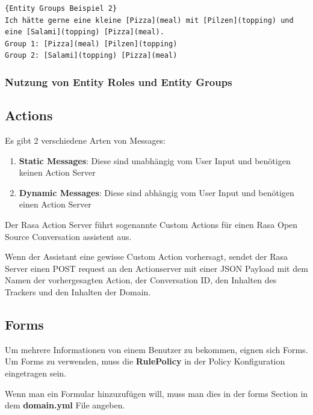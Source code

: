 \begin{lstlisting}[label={lst:entity-groups-example-2},caption={Entity Groups Beispiel 2}]{Entity Groups Beispiel 2}
Ich hätte gerne eine kleine [Pizza](meal) mit [Pilzen](topping) und eine [Salami](topping) [Pizza](meal).
Group 1: [Pizza](meal) [Pilzen](topping)
Group 2: [Salami](topping) [Pizza](meal)
\end{lstlisting}

\subsubsection{Nutzung von Entity Roles und Entity Groups}

\subsection{Actions}

Es gibt 2 verschiedene Arten von Messages:

\begin{enumerate}
    \item \textbf{Static Messages}: Diese sind unabhängig vom User Input und benötigen keinen Action Server\cite{actionsVid}
    \item \textbf{Dynamic Messages}: Diese sind abhängig vom User Input und benötigen einen Action Server\cite{actionsVid}
\end{enumerate}

Der Rasa Action Server führt sogenannte Custom Actions für einen Rasa Open Source Conversation assistent aus.

Wenn der Assistant eine gewisse Custom Action vorhersagt, sendet der Rasa Server einen POST request an den Actionserver mit einer JSON Payload mit dem Namen der vorhergesagten Action, der Conversation ID, den Inhalten des Trackers und den Inhalten der Domain.\cite{actions}

\subsection{Forms}

Um mehrere Informationen von einem Benutzer zu bekommen, eignen sich Forms.
Um Forms zu verwenden, muss die \textbf{RulePolicy} in der Policy Konfiguration eingetragen sein.\cite{forms}

Wenn man ein Formular hinzuzufügen will, muss man dies in der forms Section in dem \textbf{domain.yml} File angeben.

